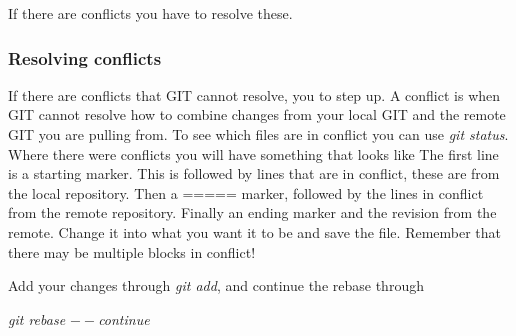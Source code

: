 \documentclass[twoside, 11pt, a4paper]{article}
\begin{document}
If there are conflicts you have to resolve these.

\subsubsection*{Resolving conflicts}
If there are conflicts that GIT cannot resolve, you to step up.
A conflict is when GIT cannot resolve how to combine changes from
your local GIT and the remote GIT you are pulling from.
To see which files are in conflict you can use \emph{git status}.
Where there were conflicts you will have something that
looks like 
The first line is a starting marker. This is followed by lines that are
in conflict, these are from the local repository. Then a ===== marker,
followed by the lines in conflict from the remote repository. Finally
an ending marker and the revision from the remote. Change it into
what you want it to be and save the file. Remember that there may
be multiple blocks in conflict!

Add your changes through \emph{git add}, and continue the rebase
through \\
\begin{center}\emph{git rebase $--$continue}\end{center}
\newpage


%
\end{document}
